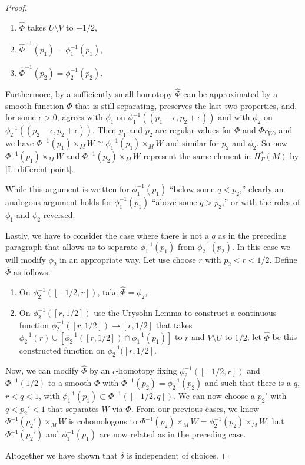 \begin{proof}
\begin{enumerate}
		\item $\hat\Phi$ takes $U\setminus V$ to $-1/2$,

		\item $\hat\Phi^{-1}(p_1) = \phi_1^{-1}(p_1)$,

		\item $\hat\Phi^{-1}(p_2) = \phi_2^{-1}(p_2)$.
	\end{enumerate}
	Furthermore, by a sufficiently small homotopy $\hat\Phi$ can be approximated by a smooth function $\Phi$ that is still separating, preserves the last two properties, and, for some $\epsilon >0$, agrees with $\phi_1$ on $\phi_1^{-1}((p_1-\epsilon,p_2+\epsilon))$ and with $\phi_2$ on $\phi_2^{-1}((p_2-\epsilon,p_2+\epsilon))$.
	Then $p_1$ and $p_2$ are regular values for $\Phi$ and $\Phi r_W$, and
	we have $\Phi^{-1}(p_1) \times_{M} W \cong \phi_1^{-1}(p_1) \times_{M} W$ and similar for $p_2$ and $\phi_2$.
	So now $\Phi^{-1}(p_1) \times_{M} W$ and $\Phi^{-1}(p_2) \times_{M} W$ represent the same element in $H^*_\Gamma(M)$ by \cref{L: different point}.

	While this argument is written for $\phi_1^{-1}(p_1)$ ``below some $q<p_2$,'' clearly an analogous argument holds for $\phi_1^{-1}(p_1)$ ``above some $q>p_2$,'' or with the roles of $\phi_1$ and $\phi_2$ reversed.

	Lastly, we have to consider the case where there is not a $q$ as in the preceding paragraph that allows us to separate $\phi_1^{-1}(p_1)$ from $\phi_2^{-1}(p_2)$.
	In this case we will modify $\phi_2$ in an appropriate way.
	Let use choose $r$ with $p_2 <r<1/2$.
	Define $\hat \Phi$ as follows:

	\begin{enumerate}
		\item On $\phi_2^{-1}([-1/2,r])$, take $\hat \Phi = \phi_2$,

		\item On $\phi_2^{-1}([r,1/2])$ use the Urysohn Lemma to construct a continuous function $\phi_2^{-1}([r,1/2]) \to [r,1/2]$ that takes $\phi_2^{-1}(r) \cup [\phi_2^{-1}([r,1/2]) \cap \phi_1^{-1}(p_1)]$ to $r$ and $V\setminus U$ to $1/2$; let $\hat \Phi$ be this constructed function on $\phi_2^{-1}([r,1/2]$.
	\end{enumerate}

	Now, we can modify $\hat \Phi$ by an $\epsilon$-homotopy fixing $\phi_2^{-1}([-1/2,r])$ and $\Phi^{-1}(1/2)$ to a smooth $\Phi$ with $\Phi^{-1}(p_2) = \phi_2^{-1}(p_2)$ and such that there is a $q$, $r<q<1$, with $\phi_1^{-1}(p_1) \subset \Phi^{-1}([-1/2,q])$.
	We can now choose a $p_2'$ with $q<p_2'<1$ that separates $W$ via $\Phi$.
	From our previous cases, we know $\Phi^{-1}(p_2')\times_{M}W$ is cohomologous to $\Phi^{-1}(p_2)\times_{M}W = \phi_2^{-1}(p_2)\times_{M}W$, but $\Phi^{-1}(p_2')$ and $\phi_1^{-1}(p_1)$ are now related as in the preceding case.

	Altogether we have shown that $\delta$ is independent of choices.
\end{proof}

